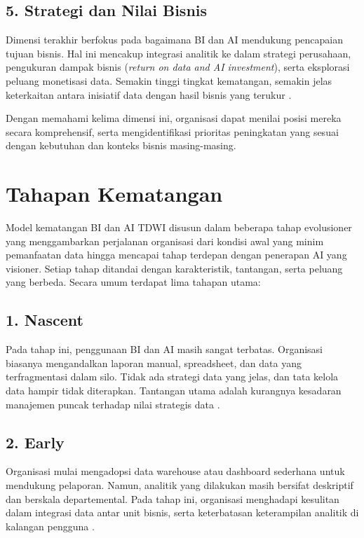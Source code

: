 \subsection*{5. Strategi dan Nilai Bisnis}
Dimensi terakhir berfokus pada bagaimana BI dan AI mendukung pencapaian tujuan bisnis. 
Hal ini mencakup integrasi analitik ke dalam strategi perusahaan, pengukuran dampak bisnis 
(\textit{return on data and AI investment}), serta eksplorasi peluang monetisasi data. 
Semakin tinggi tingkat kematangan, semakin jelas keterkaitan antara inisiatif data dengan hasil bisnis 
yang terukur \cite{labreuche2020, ekambaram2021}.  

Dengan memahami kelima dimensi ini, organisasi dapat menilai posisi mereka secara komprehensif, 
serta mengidentifikasi prioritas peningkatan yang sesuai dengan kebutuhan dan konteks bisnis masing-masing.


\section{Tahapan Kematangan}

Model kematangan BI dan AI TDWI disusun dalam beberapa tahap evolusioner yang menggambarkan 
perjalanan organisasi dari kondisi awal yang minim pemanfaatan data hingga mencapai tahap 
terdepan dengan penerapan AI yang visioner. Setiap tahap ditandai dengan karakteristik, 
tantangan, serta peluang yang berbeda. Secara umum terdapat lima tahapan utama:  

\subsection*{1. Nascent}
Pada tahap ini, penggunaan BI dan AI masih sangat terbatas. Organisasi biasanya mengandalkan 
laporan manual, spreadsheet, dan data yang terfragmentasi dalam silo. Tidak ada strategi data 
yang jelas, dan tata kelola data hampir tidak diterapkan. Tantangan utama adalah kurangnya 
kesadaran manajemen puncak terhadap nilai strategis data \cite{russom2011, tdwi2013}.  

\subsection*{2. Early}
Organisasi mulai mengadopsi data warehouse atau dashboard sederhana untuk mendukung pelaporan. 
Namun, analitik yang dilakukan masih bersifat deskriptif dan berskala departemental. 
Pada tahap ini, organisasi menghadapi kesulitan dalam integrasi data antar unit bisnis, serta 
keterbatasan keterampilan analitik di kalangan pengguna \cite{schieder2011decision, raj2018}.  

